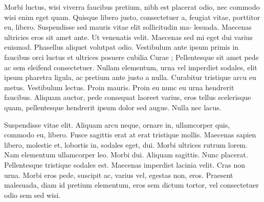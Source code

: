 \documentclass[12pt,a4paper]{article}
\begin{document}
Morbi luctus, wisi viverra faucibus pretium, nibh est placerat odio, nec
commodo wisi enim eget quam. Quisque libero justo, consectetuer a, feugiat
vitae, porttitor eu, libero. Suspendisse sed mauris vitae elit sollicitudin ma-
lesuada. Maecenas ultricies eros sit amet ante. Ut venenatis velit. Maecenas
sed mi eget dui varius euismod. Phasellus aliquet volutpat odio. Vestibulum
ante ipsum primis in faucibus orci luctus et ultrices posuere cubilia Curae ;
Pellentesque sit amet pede ac sem eleifend consectetuer. Nullam elementum,
urna vel imperdiet sodales, elit ipsum pharetra ligula, ac pretium ante justo
a nulla. Curabitur tristique arcu eu metus. Vestibulum lectus. Proin mauris.
Proin eu nunc eu urna hendrerit faucibus. Aliquam auctor, pede consequat
laoreet varius, eros tellus scelerisque quam, pellentesque hendrerit ipsum
dolor sed augue. Nulla nec lacus.

Suspendisse vitae elit. Aliquam arcu neque, ornare in, ullamcorper quis,
commodo eu, libero. Fusce sagittis erat at erat tristique mollis. Maecenas
sapien libero, molestie et, lobortis in, sodales eget, dui. Morbi ultrices rutrum
lorem. Nam elementum ullamcorper leo. Morbi dui. Aliquam sagittis. Nunc
placerat. Pellentesque tristique sodales est. Maecenas imperdiet lacinia velit.
Cras non urna. Morbi eros pede, suscipit ac, varius vel, egestas non, eros.
Praesent malesuada, diam id pretium elementum, eros sem dictum tortor,
vel consectetuer odio sem sed wisi.
\end{document}
